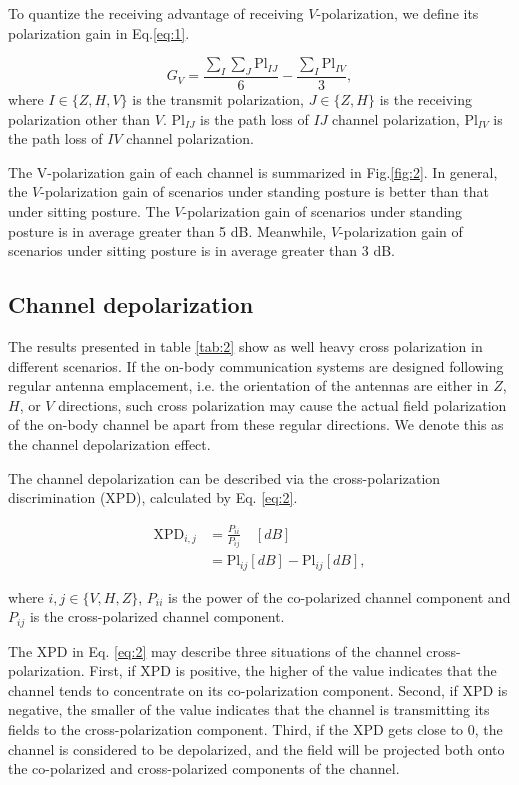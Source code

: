 \documentclass[conference]{IEEEtran}
\begin{document}
To quantize the receiving advantage of receiving $V$-polarization, we define its polarization gain in Eq.\ref{eq:1}.

\begin{equation}
	G_{V}=\frac{\sum\limits_I\sum\limits_J\text{Pl}_{IJ}}{6} -\frac{\sum\limits_I{\text{Pl}_{IV}}}{3},
\label{eq:1}
\end{equation}
where $I\in\{Z,H,V\}$ is the transmit polarization, $J\in\{Z,H\}$ is the receiving polarization other than $V$. $\text{Pl}_{IJ}$ is the path loss of $IJ$ channel polarization, $\text{Pl}_{IV}$ is the path loss of $IV$ channel polarization.

The  V-polarization gain of each channel is summarized in Fig.\ref{fig:2}. In general, the $V$-polarization gain of scenarios under standing posture is better than that under sitting posture. The $V$-polarization gain of scenarios under standing posture is in average greater than 5 dB. Meanwhile, $V$-polarization gain of scenarios under sitting posture is in average greater than 3 dB.

\subsection{Channel depolarization}
The results presented in table \ref{tab:2} show as well heavy cross polarization in different scenarios. If the on-body communication systems are designed following regular antenna emplacement, i.e. the orientation of the antennas are either in $Z$, $H$, or $V$ directions, such cross polarization may cause the actual field polarization of the on-body channel be apart from these regular directions. We denote this as the channel depolarization effect.

The channel depolarization can be described via the cross-polarization discrimination (XPD), calculated by Eq. \ref{eq:2}.

 \begin{align}
	 \text{XPD}_{i,j}&=\frac{P_{ii}}{P_{ij}} \quad[dB]\nonumber\\
	 &=\text{Pl}_{ij}[dB]-\text{Pl}_{ij}[dB], \label{eq:2}
\end{align}

where $i,j \in \{V,H,Z\}$, $P_{ii}$ is the power of the co-polarized channel component and $P_{ij}$ is the cross-polarized channel component.

The XPD in Eq. \ref{eq:2} may describe three situations of the channel cross-polarization. First, if XPD is positive, the higher of the value indicates that the channel tends to concentrate on its co-polarization component. Second, if XPD is negative, the smaller of the value indicates that the channel is transmitting its fields to the cross-polarization component. Third, if the XPD gets close to 0, the channel is considered to be depolarized, and the field will be projected both onto the co-polarized and cross-polarized components of the channel.
\end{document}
